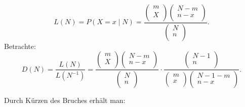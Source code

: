 \documentclass[10pt]{article}
\newenvironment{BSP}[1][]
{\begin{Beispiel}[frametitle=#1]}{\end{Beispiel}}
\begin{document}
\begin{BSP}[Beispiel 1.0000 Schätzung der Populationsgröße mit der Capture/Recapture-Methode]
		
		\begin{equation*}
			L(N) = P(X=x\mid N) =\frac{\left(
				\begin{array}{c}
					m\\
					X\\
				\end{array}
				\right) 
				\left(
				\begin{array}{c}
					N-m\\
					n-x\\
				\end{array}
				\right)}{
				\left(
				\begin{array}{c}
					N\\
					n\\
				\end{array}
				\right)}.
		\end{equation*}
		Betrachte:
		\begin{equation*}
			D(N) = \frac{L(N)}{L(N^{-1})} = \frac{\left(
				\begin{array}{c}
					m\\
					X\\
				\end{array}
				\right) 
				\left(
				\begin{array}{c}
					N-m\\
					n-x\\
				\end{array}
				\right)}{
				\left(
				\begin{array}{c}
					N\\
					n\\
				\end{array}
				\right)} \cdot 
			\frac{\left(
				\begin{array}{c}
					N-1\\
					n\\
				\end{array}
				\right)}{
				\left(
				\begin{array}{c}
					m\\
					x\\
				\end{array}
				\right)
				\left(
				\begin{array}{c}
					N-1-m\\
					n-x\\
				\end{array}\right)}.
		\end{equation*}
		
		Durch Kürzen des Bruches erhält man:
		

\end{BSP}
\end{document}
